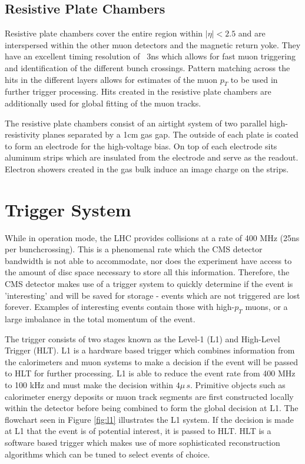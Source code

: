 \subsection{Resistive Plate Chambers}

Resistive plate chambers cover the entire region within $|\eta|<2.5$ and are interspersed within the other muon detectors and the magnetic return yoke. They have an excellent timing resolution of ~3ns which allows for fast muon triggering and identification of the different bunch crossings. Pattern matching across the hits in the different layers allows for estimates of the muon $p_{T}$ to be used in further trigger processing. Hits created in the resistive plate chambers are additionally used for global fitting of the muon tracks.

The resistive plate chambers consist of an airtight system of two parallel high-resistivity planes separated by a 1cm gas gap. The outside of each plate is coated to form an electrode for the high-voltage bias. On top of each electrode sits aluminum strips which are insulated from the electrode and serve as the readout. Electron showers created in the gas bulk induce an image charge on the strips.

\section{Trigger System}

While in operation mode, the LHC provides collisions at a rate of 400 MHz (25ns per bunchcrossing). This is a phenomenal rate which the CMS detector bandwidth is not able to accommodate, nor does the experiment have access to the amount of disc space necessary to store all this information. Therefore, the CMS detector makes use of a trigger system to quickly determine if the event is 'interesting' and will be saved for storage - events which are not triggered are lost forever. Examples of interesting events contain those with high-$p_{T}$ muons, or a large imbalance in the total momentum of the event.\cite{CMS-TRG-12-001}

The trigger consists of two stages known as the Level-1 (L1) and High-Level Trigger (HLT). L1 is a hardware based trigger which combines information from the calorimeters and muon systems to make a decision if the event will be passed to HLT for further processing. L1 is able to reduce the event rate from 400 MHz to 100 kHz and must make the decision within $4\mu\,s$. Primitive objects such as calorimeter energy deposits or muon track segments are first constructed locally within the detector before being combined to form the global decision at L1. The flowchart seen in Figure \ref{fig:l1} illustrates the L1 system. If the decision is made at L1 that the event is of potential interest, it is passed to HLT. HLT is a software based trigger which makes use of more sophisticated reconstruction algorithms which can be tuned to select events of choice.

